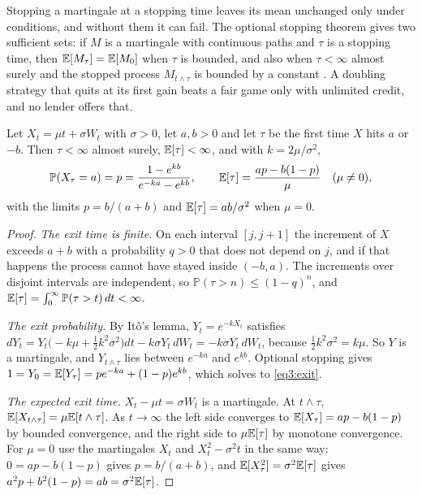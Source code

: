 \begin{chapterrefs}
Stopping a martingale at a stopping time leaves its mean unchanged only under conditions, and without
them it can fail. The optional stopping theorem gives two sufficient sets: if
$M$ is a martingale with continuous paths and $\tau$ is a stopping time, then $\mathbb{E}[M_\tau]=\mathbb{E}[M_0]$ when
$\tau$ is bounded, and also when $\tau<\infty$ almost surely and the stopped process $M_{t\wedge\tau}$
is bounded by a constant \parencite[Section~1.3]{karatzas1998}. A doubling strategy that quits at its first
gain beats a fair game only with unlimited credit, and no lender offers that.

\begin{proposition}\label{prop3:exit}
Let $X_t=\mu t+\sigma W_t$ with $\sigma>0$, let $a,b>0$ and let $\tau$ be the first time $X$ hits $a$ or
$-b$. Then $\tau<\infty$ almost surely, $\mathbb{E}[\tau]<\infty$, and with $k=2\mu/\sigma^2$,
\begin{equation}\label{eq3:exit}
  \mathbb P(X_\tau=a)=p=\frac{1-e^{kb}}{e^{-ka}-e^{kb}},\qquad
  \mathbb{E}[\tau]=\frac{ap-b(1-p)}{\mu}\quad(\mu\neq0),
\end{equation}
with the limits $p=b/(a+b)$ and $\mathbb{E}[\tau]=ab/\sigma^2$ when $\mu=0$.
\end{proposition}

\begin{proof}
\emph{The exit time is finite.} On each interval $[j,j+1]$ the increment of $X$ exceeds $a+b$ with a
probability $q>0$ that does not depend on $j$, and if that happens the process cannot have stayed
inside $(-b,a)$. The increments over disjoint intervals are independent, so $\mathbb P(\tau>n)\le(1-q)^n$, and
$\mathbb{E}[\tau]=\int_0^\infty \mathbb P(\tau>t)\,dt<\infty$.

\emph{The exit probability.} By It\^o's lemma, $Y_t=e^{-kX_t}$ satisfies
$dY_t=Y_t\bigl(-k\mu+\tfrac12k^2\sigma^2\bigr)dt-k\sigma Y_t\,dW_t=-k\sigma Y_t\,dW_t$, because
$\tfrac12k^2\sigma^2=k\mu$. So $Y$ is a martingale, and $Y_{t\wedge\tau}$ lies between $e^{-ka}$ and $e^{kb}$.
Optional stopping gives $1=Y_0=\mathbb{E}[Y_\tau]=pe^{-ka}+(1-p)e^{kb}$, which solves to \cref{eq3:exit}.

\emph{The expected exit time.} $X_t-\mu t=\sigma W_t$ is a martingale. At $t\wedge\tau$,
$\mathbb{E}[X_{t\wedge\tau}]=\mu\mathbb{E}[t\wedge\tau]$. As $t\to\infty$ the left side converges to $\mathbb{E}[X_\tau]=ap-b(1-p)$
by bounded convergence, and the right side to $\mu\mathbb{E}[\tau]$ by monotone convergence. For $\mu=0$ use
the martingales $X_t$ and $X_t^2-\sigma^2t$ in the same way: $0=ap-b(1-p)$ gives $p=b/(a+b)$, and
$\mathbb{E}[X_\tau^2]=\sigma^2\mathbb{E}[\tau]$ gives $a^2p+b^2(1-p)=ab=\sigma^2\mathbb{E}[\tau]$.
\end{proof}


\end{chapterrefs}

